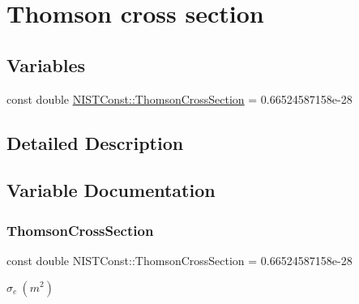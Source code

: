 \hypertarget{group___thomson}{}\section{Thomson cross section}
\label{group___thomson}
\subsection*{Variables}
\begin{DoxyCompactItemize}
\item 
const double \hyperlink{group___thomson_gac0806b1a7f3e82009afeac7ea16728ce}{N\+I\+S\+T\+Const\+::\+Thomson\+Cross\+Section} = 0.\+66524587158e-\/28
\end{DoxyCompactItemize}


\subsection{Detailed Description}


\subsection{Variable Documentation}
\mbox{\label{group___thomson_gac0806b1a7f3e82009afeac7ea16728ce}} 
\subsubsection{\texorpdfstring{Thomson\+Cross\+Section}{ThomsonCrossSection}}
{\footnotesize\ttfamily const double N\+I\+S\+T\+Const\+::\+Thomson\+Cross\+Section = 0.\+66524587158e-\/28}

$\sigma_e \ (m^2)$ 